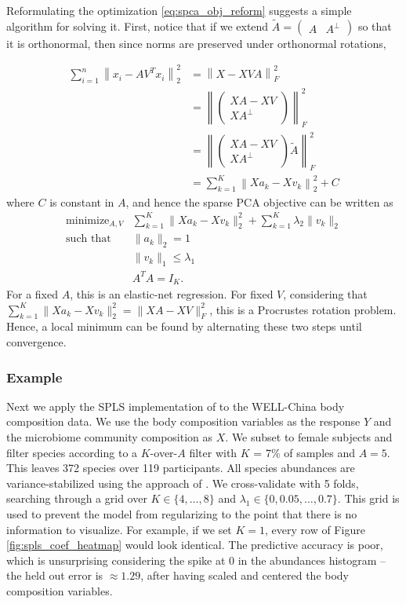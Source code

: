 \documentclass{article}
\begin{document}
Reformulating the optimization \ref{eq:spca_obj_reform} suggests a simple
algorithm for solving it. First, notice that if we extend $\tilde{A}
= \begin{pmatrix} A & A^{\perp}\end{pmatrix}$ so that it is orthonormal, then
since norms are preserved under orthonormal rotations,

\begin{align*}
  \sum_{i = 1}^{n} \left\|x_i - AV^T x_i\right\|_2^2 &= \left\|X - XVA\right\|_{F}^2 \\
  &= \left\|\begin{pmatrix} XA - XV \\ XA^{\perp} \end{pmatrix} \right\|_{F}^2 \\
  &= \left\|\begin{pmatrix} XA - XV \\ XA^{\perp} \end{pmatrix} \tilde{A} \right\|_{F}^2 \\
  &= \sum_{k = 1}^{K} \left\|Xa_k - X v_k\right\|_2^2 + C
\end{align*}
where $C$ is constant in $A$, and hence the sparse PCA objective can be written
as
\begin{align*}
  \text{minimize}_{A, V} &\sum_{k = 1}^{K} \|Xa_k - X v_k\|_2^2 + \sum_{k = 1}^{K} \lambda_2 \|v_k\|_2 \\
  \text{such that }&\|a_k\|_2 = 1 \\
  & \|v_k\|_1 \leq \lambda_1 \\
  &A^TA = I_K.
\end{align*}
For a fixed $A$, this is an elastic-net regression. For fixed $V$, considering
that $\sum_{k = 1}^{K} \|Xa_k - Xv_k\|^2_2 = \|XA - XV\|_F^2$, this is a
Procrustes rotation problem. Hence, a local minimum can be found by alternating
these two steps until convergence.

\subsubsection{Example}
\label{subsubsec:spls_example}

Next we apply the SPLS implementation of \cite{chung2012spls} to the WELL-China
body composition data. We use the body composition variables as the response
$Y$ and the microbiome community composition as $X$. We subset to female
subjects and filter species according to a $K$-over-$A$ filter with $K$ = 7\% of
samples and $A = 5$. This leaves 372 species over 119 participants. All species
abundances are variance-stabilized using the approach of
\cite{anders2010differential}. We cross-validate with 5 folds, searching through
a grid over $K \in \{4, \dots, 8\}$ and $\lambda_1 \in \{0, 0.05, \dots, 0.7\}$.
This grid is used to prevent the model from regularizing to the point that there
is no information to visualize. For example, if we set $K = 1$, every row of
Figure \ref{fig:spls_coef_heatmap} would look identical. The predictive accuracy
is poor, which is unsurprising considering the spike at 0 in the abundances
histogram -- the held out error is $\approx 1.29$, after having scaled and
centered the body composition variables.
\end{document}
